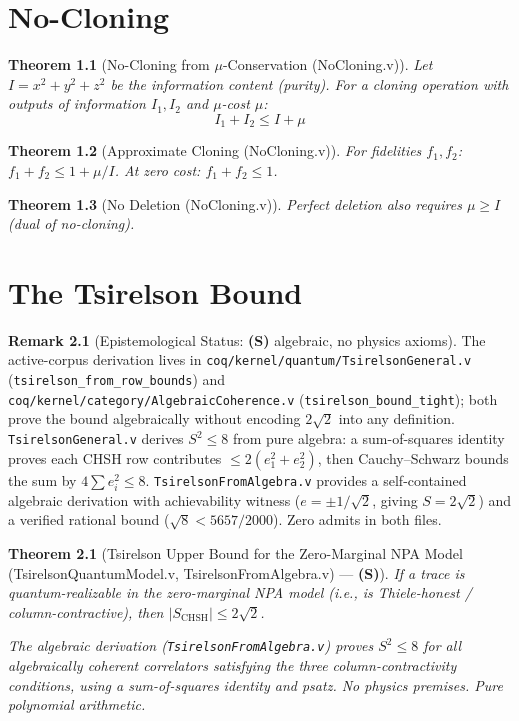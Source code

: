 \documentclass[11pt, a4paper]{report}
\theoremstyle{definition}
\newtheorem{remark}{Remark}[chapter]
\theoremstyle{plain}
\newtheorem{theorem}{Theorem}[chapter]
\begin{document}
\chapter{No-Cloning}

\begin{theorem}[No-Cloning from $\mu$-Conservation {\normalfont (NoCloning.v)}]
Let $I = x^2 + y^2 + z^2$ be the information content (purity). For a cloning operation with outputs of information $I_1, I_2$ and $\mu$-cost $\mu$:
\[ I_1 + I_2 \le I + \mu \]
\end{theorem}

\begin{theorem}[Approximate Cloning {\normalfont (NoCloning.v)}]
For fidelities $f_1, f_2$: $f_1 + f_2 \le 1 + \mu/I$. At zero cost: $f_1 + f_2 \le 1$.
\end{theorem}

\begin{theorem}[No Deletion {\normalfont (NoCloning.v)}]
Perfect deletion also requires $\mu \ge I$ (dual of no-cloning).
\end{theorem}

\chapter{The Tsirelson Bound}

\begin{remark}[Epistemological Status: \textbf{(S)} algebraic, no physics axioms]
The active-corpus derivation lives in \texttt{coq/kernel/quantum/TsirelsonGeneral.v} (\texttt{tsirelson\_from\_row\_bounds}) and \texttt{coq/kernel/category/AlgebraicCoherence.v} (\texttt{tsirelson\_bound\_tight}); both prove the bound algebraically without encoding $2\sqrt{2}$ into any definition. \texttt{TsirelsonGeneral.v} derives $S^2 \le 8$ from pure algebra: a sum-of-squares identity proves each CHSH row contributes $\le 2(e_1^2 + e_2^2)$, then Cauchy--Schwarz bounds the sum by $4\sum e_i^2 \le 8$. \texttt{TsirelsonFromAlgebra.v} provides a self-contained algebraic derivation with achievability witness ($e = \pm 1/\sqrt{2}$, giving $S = 2\sqrt{2}$) and a verified rational bound ($\sqrt{8} < 5657/2000$). Zero admits in both files.
\end{remark}

\begin{theorem}[Tsirelson Upper Bound for the Zero-Marginal NPA Model {\normalfont (TsirelsonQuantumModel.v, TsirelsonFromAlgebra.v)} --- \textbf{(S)}]
If a trace is quantum-realizable in the zero-marginal NPA model (i.e., is Thiele-honest / column-contractive), then $|S_{\mathrm{CHSH}}| \le 2\sqrt{2}$.

The algebraic derivation (\texttt{TsirelsonFromAlgebra.v}) proves $S^2 \le 8$ for all algebraically coherent correlators satisfying the three column-contractivity conditions, using a sum-of-squares identity and psatz. No physics premises. Pure polynomial arithmetic.
\end{theorem}
\end{document}
